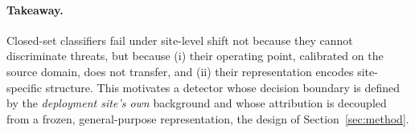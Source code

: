 \paragraph{Takeaway.} Closed-set classifiers fail under site-level shift not
because they cannot discriminate threats, but because (i) their operating point,
calibrated on the source domain, does not transfer, and (ii) their representation
encodes site-specific structure. This motivates a detector whose decision
boundary is defined by the \emph{deployment site's own} background and whose
attribution is decoupled from a frozen, general-purpose representation, the
design of Section~\ref{sec:method}.
